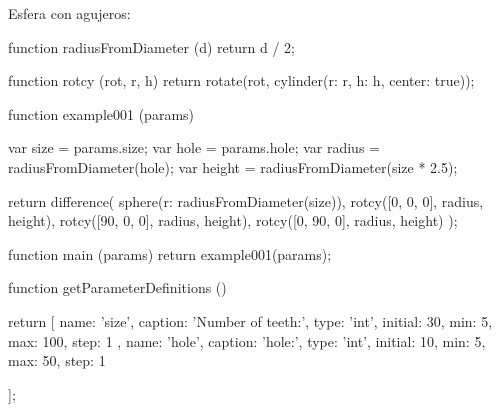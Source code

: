 Esfera con agujeros:

function radiusFromDiameter (d) {
  return d / 2;
}

function rotcy (rot, r, h) {
  return rotate(rot, cylinder({r: r, h: h, center: true}));
}

function example001 (params) {
  var size = params.size;
  var hole = params.hole;
  var radius = radiusFromDiameter(hole);
  var height = radiusFromDiameter(size * 2.5);

  return difference(
    sphere({r: radiusFromDiameter(size)}),
    rotcy([0, 0, 0], radius, height),
    rotcy([90, 0, 0], radius, height),
    rotcy([0, 90, 0], radius, height)
  );
}

function main (params) {
  return example001(params);
}

function getParameterDefinitions () {
  return [
    { name: 'size', caption: 'Number of teeth:', type: 'int', initial: 30, min: 5, max: 100, step: 1 },
    { name: 'hole', caption: 'hole:', type: 'int', initial: 10, min: 5, max: 50, step: 1 }

  ];
}